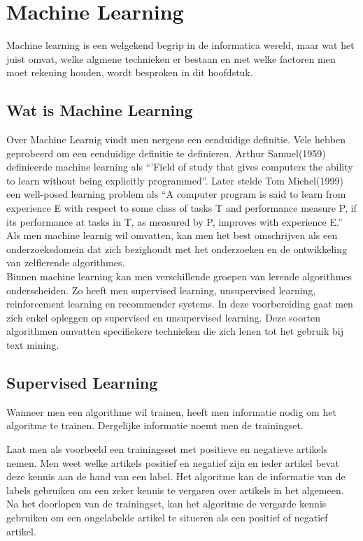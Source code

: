 \chapter{Machine Learning}\label{Machine Learning}

Machine learning is een welgekend begrip in de informatica wereld, maar wat het juist omvat, welke algmene technieken er bestaan en met welke factoren men moet rekening houden, wordt besproken in dit hoofdstuk.

\section{Wat is Machine Learning}\label{Wat is Machine Learning}

Over Machine Learnig vindt men nergens een eenduidige definitie. Vele hebben geprobeerd om een eenduidige definitie te definieren. Arthur Samuel(1959) definieerde machine learning als ``'Field of study that gives computers the ability to learn without being explicitly programmed''. Later stelde Tom Michel(1999) een well-posed learning problem als ``A computer program is said to learn from experience E with respect to some class of tasks T and performance measure P, if its performance at tasks in T, as measured by P, improves with experience E.'' Als men machine learnig wil omvatten, kan men het best omschrijven als een onderzoeksdomein dat zich bezighoudt met het onderzoeken en de ontwikkeling van zelflerende algorithmes.
\\
Binnen machine learning kan men verschillende groepen van lerende algorithmes onderscheiden. Zo heeft men supervised learning, unsupervised learning, reinforcement learning en recommender systems. In deze voorbereiding gaat men zich enkel opleggen op supervised en unsupervised learning. Deze soorten algorithmen omvatten specifiekere technieken die zich lenen tot het gebruik bij text mining.


\section{Supervised Learning}\label{Supervised Learning}

Wanneer men een algorithme wil trainen, heeft men informatie nodig om het algoritme te trainen. Dergelijke informatie noemt men de trainingset.

Laat men als voorbeeld een trainingsset met positieve en negatieve artikels nemen. Men weet welke artikels positief en negatief zijn en ieder artikel bevat deze kennis aan de hand van een label. Het algoritme kan de informatie van de labels gebruiken om een zeker kennis te vergaren over artikels in het algemeen. Na het doorlopen van de trainingset, kan het algoritme de vergarde kennis gebruiken om een ongelabelde artikel te situeren als een positief of negatief artikel.

